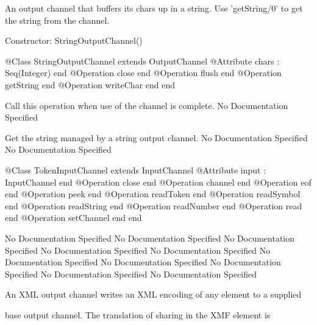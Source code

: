       An output channel that buffers its chars up in a string.
      Use 'getString/0' to get the string from the channel.
      
      Constructor: StringOutputChannel()
\begin{Interface}
@Class StringOutputChannel extends OutputChannel
  @Attribute chars : Seq(Integer) end
  @Operation close end
  @Operation flush end
  @Operation getString end
  @Operation writeChar end
end
\end{Interface}

         Call this operation when use of the channel is complete.
No Documentation Specified

        Get the string managed by a string output channel.
No Documentation Specified
No Documentation Specified
\begin{Interface}
@Class TokenInputChannel extends InputChannel
  @Attribute input : InputChannel end
  @Operation close end
  @Operation channel end
  @Operation eof end
  @Operation peek end
  @Operation readToken end
  @Operation readSymbol end
  @Operation readString end
  @Operation readNumber end
  @Operation read end
  @Operation setChannel end
end
\end{Interface}
No Documentation Specified
No Documentation Specified
No Documentation Specified
No Documentation Specified
No Documentation Specified
No Documentation Specified
No Documentation Specified
No Documentation Specified
No Documentation Specified
No Documentation Specified

      An XML output channel writes an XML encoding of any element to a supplied

      base output channel. The translation of sharing in the XMF element is

